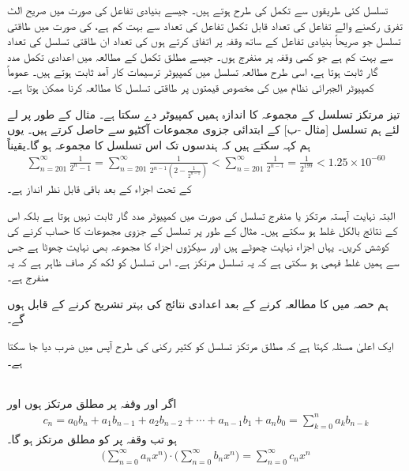 تسلسل کئی طریقوں سے تکمل کی طرح ہوتے ہیں۔ جیسے بنیادی تفاعل کی صورت میں صریح الٹ تفرق رکھنے والے تفاعل کی تعداد قابل تکمل تفاعل کی تعداد سے بہت کم ہے،  کی صورت میں طاقتی تسلسل جو  صریحاً بنیادی تفاعل کے ساتھ  وقفہ  پر اتفاق کرتے ہوں کی تعداد ان طاقتی تسلسل کی تعداد سے بہت کم ہے جو کسی   وقفہ پر منفرج ہوں۔ جیسے  مطلق تکمل کے مطالعہ میں اعدادی تکمل مدد گار ثابت ہوتا ہے، اسی طرح مطالعہ تسلسل میں کمپیوٹر ترسیمات کار آمد ثابت ہوتے ہیں۔ عموماً کمپیوٹر الجبرائی نظام میں  کی مخصوص قیمتوں پر طاقتی تسلسل کا مطالعہ کرنا ممکن ہوتا ہے۔

تیز مرتکز تسلسل کے مجموعہ  کا اندازہ ہمیں کمپیوٹر دے سکتا ہے۔ مثال کے طور پر   لے لئے ہم تسلسل  [مثال -ب] کے ابتدائی جزوی مجموعات آکٹیو سے  حاصل کرتے ہیں۔ یوں ہم کہہ سکتے ہیں کہ  ہندسوں تک اس تسلسل کا مجموعہ  ہو گا۔یقیناً
\begin{align*}
\sum_{n=201}^{\infty}\frac{1}{2^n-1}=\sum_{n=201}^{\infty}\frac{1}{2^{n-1}(2-\tfrac{1}{2^{n-1}})}<\sum_{n=201}^{\infty}\frac{1}{2^{n-1}}=\frac{1}{2^{199}}<1.25\times 10^{-60}
\end{align*}
کے تحت  اجزاء کے بعد باقی قابل نظر انداز ہے۔

البتہ نہایت آہستہ مرتکز  یا منفرج تسلسل کی صورت میں کمپیوٹر مدد گار ثابت نہیں ہوتا ہے بلکہ اس کے نتائج بالکل غلط ہو سکتے ہیں۔ مثال کے طور پر تسلسل  کے جزوی مجموعات کا حساب کرنے کی کوشش کریں۔ یہاں اجزاء نہایت چھوٹے ہیں اور سیکڑوں اجزاء کا مجموعہ بھی نہایت چھوٹا ہے جس سے ہمیں غلط فہمی ہو سکتی ہے کہ یہ تسلسل مرتکز ہے۔ اس تسلسل کو  لکھ کر صاف ظاہر ہے کہ یہ منفرج ہے۔

ہم حصہ  میں  کا مطالعہ کرنے کے بعد اعدادی نتائج کی بہتر تشریح کرنے کے قابل ہوں گے۔

ایک اعلیٰ مسئلہ کہتا ہے کہ مطلق مرتکز تسلسل کو کثیر رکنی کی طرح آپس میں ضرب دیا جا سکتا ہے۔

\\
اگر  اور  وقفہ  پر مطلق مرتکز ہوں اور
\begin{align*}
c_n=a_0b_n+a_1b_{n-1}+a_2b_{n-2}+\cdots+a_{n-1}b_1+a_nb_0=\sum_{k=0}^{n}a_kb_{n-k}
\end{align*}
ہو تب  وقفہ پر    کو مطلق مرتکز ہو گا۔
\begin{align*}
\big(\sum_{n=0}^{\infty}a_nx^n\big)\cdot\big(\sum_{n=0}^{\infty}b_nx^n\big)=\sum_{n=0}^{\infty}c_nx^n
\end{align*}

